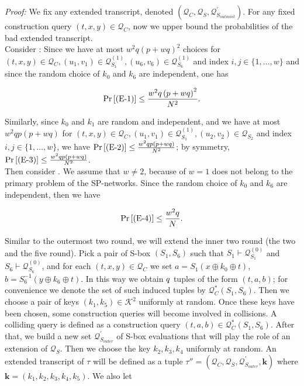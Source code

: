 \noindent \emph{Proof:} We fix any extended transcript, denoted $\left(\mathcal{Q}_{C}, \mathcal{Q}_{S}, \mathcal{Q}_{S_{outmost}}^{\prime}\right)$. For any fixed construction query $(t, x, y) \in \mathcal{Q}_{C}$, now we upper bound the probabilities of the bad extended transcript.\\

\noindent Consider \eone: Since we have at most $w^{2} q \left(p+w q\right)^{2}$ choices for $(t, x, y) \in \mathcal{Q}_{C}, \left(u_{1}, v_{1}\right) \in \mathcal{Q}_{S_{1}}^{(1)}, \left(u_{6}, v_{6}\right) \in \mathcal{Q}_{S_{6}}^{(1)}$ and index $i, j \in \{1, \ldots, w\}$ and since the random choice of $k_{0}$ and $k_{6}$ are independent, one has

$$
\operatorname{Pr}\left[\text{(E-1)}\right] \leq \frac{w^{2} q \left(p+w q\right)^{2}}{N^{2}}.
$$

\noindent Similarly, since $k_{0}$ and $k_{1}$ are random and independent, and we have at most $w^{2} q p \left(p+w q\right)$ for $(t, x, y) \in \mathcal{Q}_{C}, \left(u_{1}, v_{1}\right) \in \mathcal{Q}_{S_{1}}^{(1)}, \left(u_{2}, v_{2}\right) \in \mathcal{Q}_{S_{2}}$ and index $i, j \in \{1, \ldots, w\}$, we have $\operatorname{Pr}\left[\text{(E-2)}\right] \leq \frac{w^{2} q p \left(p+w q\right)}{N^{2}}$; by symmetry, $\operatorname{Pr}\left[\text{(E-3)}\right] \leq \frac{w^{2} q p \left(p+w q\right)}{N^{2}}$. \\

\noindent Then consider \bfour. We assume that $w \neq 2$, because of $w = 1$ does not belong to the primary problem of the SP-networks. Since the random choice of $k_{0}$ and $k_{6}$ are independent, then we have

$$
\operatorname{Pr}\left[\text{(E-4)}\right] \leq \frac{w^{2} q}{N}.
$$

Similar to the outermost two round, we will extend the inner two round (the two and the five round).  Pick a pair of S-box $(S_1, S_6)$ such that $S_{1} \vdash \mathcal{Q}_{S_{1}}^{(0)}$ and $S_{6} \vdash \mathcal{Q}_{S_{6}}^{(0)}$, and for each $ (t, x, y) \in \mathcal{Q}_{C}$ we set $a=S_{1}\left(x \oplus k_{0} \oplus t\right)$, $b=S_{6}^{-1}\left(y \oplus k_{6} \oplus t\right)$. In this way we obtain $\mathnormal{q}$ tuples of the form $(t, a, b)$; for convenience we denote the set of such induced tuples by $\mathcal{Q}_{C}^{*}\left(S_{1}, S_{6}\right)$. Then we choose a pair of keys $\left(k_{1}, k_{5}\right) \in \mathcal{K}^{2}$ uniformly at random. Once these keys have been chosen, some construction queries will become involved in collisions. A colliding query is defined as a construction query $(t, a, b) \in \mathcal{Q}_{C}^{*}\left(S_{1}, S_{6}\right)$. After that, we build a new set $\mathcal{Q}_{S_{outer}}^{\prime}$ of S-box evaluations that will play the role of an extension of $\mathcal{Q}_{S}$. Then we choose the key $k_2, k_3, k_4$ uniformly at random. An extended transcript of $\tau$ will be defined as a tuple $\tau''=\left(\mathcal{Q}_{C}, \mathcal{Q}_{S}, \mathcal{Q}_{S_{outer}}^{\prime}, \mathbf{k}\right)$ where $\mathbf{k}=\left(k_{1}, k_{2},k_{3},k_{4}, k_{5}\right)$. We also let

